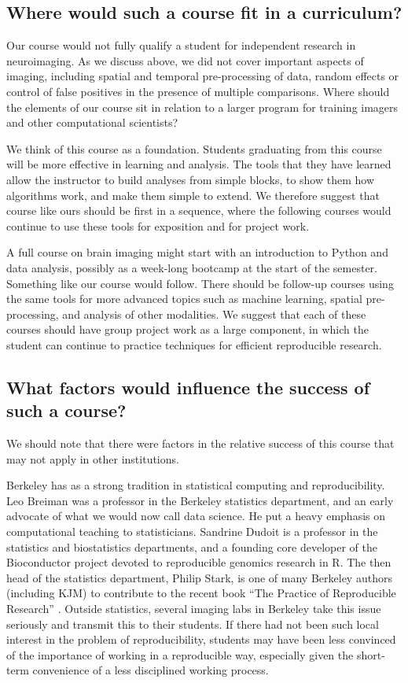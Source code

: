 \subsection{Where would such a course fit in a curriculum?}

Our course would not fully qualify a student for independent research in
neuroimaging.  As we discuss above, we did not cover important aspects of
imaging, including spatial and temporal pre-processing of data, random effects
or control of false positives in the presence of multiple comparisons.  Where
should the elements of our course sit in relation to a larger program for
training imagers and other computational scientists?

We think of this course as a foundation.  Students graduating from this course
will be more effective in learning and analysis.  The tools that they have
learned allow the instructor to build analyses from simple blocks, to
show them how algorithms work, and make them simple to extend.  We therefore
suggest that course like ours should be first in a sequence, where the
following courses would continue to use these tools for exposition and for
project work.

A full course on brain imaging might start with an introduction to Python and
data analysis, possibly as a week-long bootcamp at the start of the semester.
Something like our course would follow.  There should be follow-up courses
using the same tools for more advanced topics such as machine learning,
spatial pre-processing, and analysis of other modalities. We suggest that each
of these courses should have group project work as a large component, in which
the student can continue to practice techniques for efficient reproducible
research.

\subsection{What factors would influence the success of such a course?}

We should note that there were factors in the relative success of this
course that may not apply in other institutions.

Berkeley has as a strong tradition in statistical computing and
reproducibility.  Leo Breiman was a professor in the Berkeley statistics
department, and an early advocate of what we would now call data science.  He
put a heavy emphasis on computational teaching to statisticians.  Sandrine
Dudoit is a professor in the statistics and biostatistics departments, and a
founding core developer of the Bioconductor project devoted to reproducible
genomics research in R.  The then head of the statistics department, Philip
Stark, is one of many Berkeley authors (including KJM) to contribute to the
recent book ``The Practice of Reproducible Research''
\citep{kitzes2017practice}. Outside statistics, several imaging labs in
Berkeley take this issue seriously and transmit this to their students.  If
there had not been such local interest in the problem of reproducibility,
students may have been less convinced of the importance of
working in a reproducible way, especially given the short-term convenience
of a less disciplined working process.


